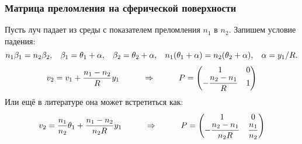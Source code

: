 \subsubsection*{Матрица преломления на сферической поверхности}

Пусть луч падает из среды с показателем преломления $n_1$ в $n_2$. Запишем условие падения:
\begin{equation*}
	n_1 \beta_1 = n_2 \beta_2,
	\hspace{0.3 cm}
	\beta_1 = \theta_1 + \alpha,
	\hspace{0.3 cm}
	\beta_2 = \theta_2 + \alpha,
	\hspace{0.3 cm}
	n_1 (\theta_1 + \alpha) = n_2 (\theta_2 + \alpha),
	\hspace{0.3 cm}
	\alpha = y_1/R.
\end{equation*}
\begin{equation}
	v_2 = v_1 + \dfrac{n_1 - n_2}{R}y_1
	\hspace{1 cm}
	\Rightarrow
	\hspace{1 cm}
	P= \begin{pmatrix}
		1 & 0 \\ -\dfrac{n_2 - n_1}{R} & 1
	\end{pmatrix}
	\label{p-matrix}
\end{equation}
Или ещё в литературе она может встретиться как:
\begin{equation*}
	v_2 = \frac{n_1}{n_2} \theta_1 + \frac{n_1 - n_2}{n_2 R}y_1
	\hspace{1 cm}
	\Rightarrow
	\hspace{1 cm}
	P =\begin{pmatrix}
		1 & 0 \\ -\dfrac{n_2 - n_1}{n_2 R} & \dfrac{n_1}{n_2}
	\end{pmatrix}
\end{equation*}

